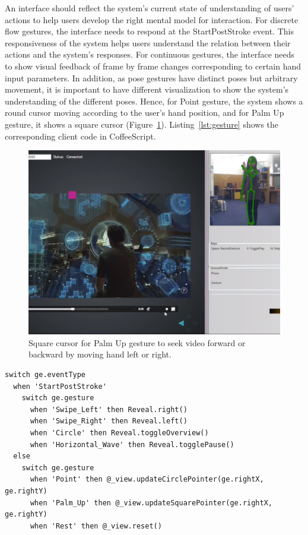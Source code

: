 An interface
should reflect the system's current state of understanding of users'
actions to help users develop the right mental model for interaction. For
discrete flow gestures, the interface needs to respond at the StartPostStroke
event. This responsiveness of the system helps users understand the relation
between their actions and the system's responses. For continuous gestures, the
interface needs to show visual feedback of frame by frame changes
corresponding to certain hand input parameters. In addition, as pose gestures
have distinct poses but arbitrary movement, it is important to have different 
visualization to show the system's understanding of the different
poses. Hence, for Point gesture, the system shows a round cursor moving
according to the user's hand position, and for Palm Up gesture, it shows a
square cursor (Figure~\ref{fig:palm-up}).
Listing~\ref{lst:gesture} shows the corresponding client code in CoffeeScript.

\begin{figure}[tbh]
\centering
\includegraphics[trim=0 2.7cm 0 0,
clip, width=\columnwidth]{figures/video_control.PNG}
\caption{Square cursor for Palm Up gesture to seek video forward or backward by
moving hand left or right.}
\label{fig:palm-up}
\end{figure}

\begin{lstlisting}[caption={Client code mapping gesture events to actions in
CoffeeScript.}, label={lst:client-code}] 
switch ge.eventType
  when 'StartPostStroke'
    switch ge.gesture
      when 'Swipe_Left' then Reveal.right()
      when 'Swipe_Right' then Reveal.left()
      when 'Circle' then Reveal.toggleOverview()
      when 'Horizontal_Wave' then Reveal.togglePause()
  else
    switch ge.gesture
      when 'Point' then @_view.updateCirclePointer(ge.rightX, ge.rightY)
      when 'Palm_Up' then @_view.updateSquarePointer(ge.rightX, ge.rightY)
      when 'Rest' then @_view.reset()
\end{lstlisting}

